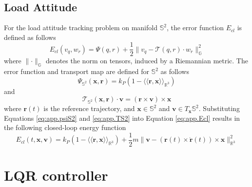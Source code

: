 \subsection{Load Attitude}
For the load attitude tracking problem on manifold $ \mathbb{S}^2 $, the error function $ E_{cl} $ is defined as follows \cite[p.]{Bullo2005}
\begin{equation}\label{eq:app.Ecl}
E_{cl}(v_{q},w_r)=\Psi(q,r)+\frac{1}{2}\parallel v_q-\mathcal{T}(q,r)\cdot w_r\parallel^2_{\mathbb{G}}
\end{equation}
where $ \parallel\cdot\parallel_{\mathbb{G}} $ denotes the norm on tensors, induced by a Riemannian metric. 
The error function and transport map are defined for $ \mathbb{S}^2 $ as follows
\begin{equation}\label{eq:app.psiS2}
\Psi_{\mathbb{S}^2}(\mathbf{x,r})=k_P(1-\langle\!\langle\mathbf{ r,x}\rangle\!\rangle_{\mathbb{R}^3})
\end{equation}
and
\begin{equation}\label{eq:app.TS2}
\mathcal{T}_{\mathbb{S}^2}(\mathbf{x,r})\cdot \mathbf{v}=\mathbf{(r\times v)\times x}
\end{equation}
where $ \mathbf{r}(t) $ is the reference trajectory, and  $ \mathbf{x}\in\mathbb{S}^2 $ and $ \mathbf{v}\in T_\mathbf{x}\mathbb{S}^2 $.
Substituting Equations \ref{eq:app.psiS2} and \ref{eq:app.TS2} into Equation \ref{eq:app.Ecl} results in the following closed-loop energy function 
\begin{equation}\label{eq:app.EclS2}
E_{cl}(t,\mathbf{x,v})=k_P(1-\langle\!\langle\mathbf{ r,x}\rangle\!\rangle_{\mathbb{R}^3})+\frac{1}{2}m\parallel \mathbf{v}-(\mathbf{r}(t)\times \mathbf{\dot{r}}(t))\times \mathbf{x}\parallel^2_{\mathbb{R}^3}
\end{equation}

\section{LQR controller}\label{app:lqr}
%

